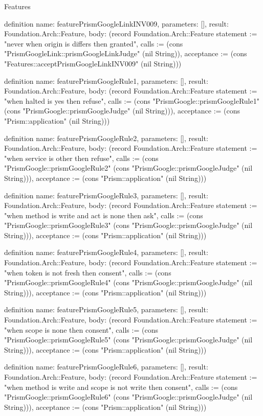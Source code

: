 \begin{lexlean}{Features}
\begin{semanticmodule}
definition{
  name: featurePrismGoogleLinkINV009,
  parameters: [],
  result: Foundation.Arch::Feature,
  body: (record Foundation.Arch::Feature {statement := "never when origin is differs then granted", calls := (cons "PrismGoogleLink::prismGoogleLinkJudge" (nil String)), acceptance := (cons "Features::acceptPrismGoogleLinkINV009" (nil String))})
}

definition{
  name: featurePrismGoogleRule1,
  parameters: [],
  result: Foundation.Arch::Feature,
  body: (record Foundation.Arch::Feature {statement := "when halted is yes then refuse", calls := (cons "PrismGoogle::prismGoogleRule1" (cons "PrismGoogle::prismGoogleJudge" (nil String))), acceptance := (cons "Prism::application" (nil String))})
}

definition{
  name: featurePrismGoogleRule2,
  parameters: [],
  result: Foundation.Arch::Feature,
  body: (record Foundation.Arch::Feature {statement := "when service is other then refuse", calls := (cons "PrismGoogle::prismGoogleRule2" (cons "PrismGoogle::prismGoogleJudge" (nil String))), acceptance := (cons "Prism::application" (nil String))})
}

definition{
  name: featurePrismGoogleRule3,
  parameters: [],
  result: Foundation.Arch::Feature,
  body: (record Foundation.Arch::Feature {statement := "when method is write and act is none then ask", calls := (cons "PrismGoogle::prismGoogleRule3" (cons "PrismGoogle::prismGoogleJudge" (nil String))), acceptance := (cons "Prism::application" (nil String))})
}

definition{
  name: featurePrismGoogleRule4,
  parameters: [],
  result: Foundation.Arch::Feature,
  body: (record Foundation.Arch::Feature {statement := "when token is not fresh then consent", calls := (cons "PrismGoogle::prismGoogleRule4" (cons "PrismGoogle::prismGoogleJudge" (nil String))), acceptance := (cons "Prism::application" (nil String))})
}

definition{
  name: featurePrismGoogleRule5,
  parameters: [],
  result: Foundation.Arch::Feature,
  body: (record Foundation.Arch::Feature {statement := "when scope is none then consent", calls := (cons "PrismGoogle::prismGoogleRule5" (cons "PrismGoogle::prismGoogleJudge" (nil String))), acceptance := (cons "Prism::application" (nil String))})
}

definition{
  name: featurePrismGoogleRule6,
  parameters: [],
  result: Foundation.Arch::Feature,
  body: (record Foundation.Arch::Feature {statement := "when method is write and scope is not write then consent", calls := (cons "PrismGoogle::prismGoogleRule6" (cons "PrismGoogle::prismGoogleJudge" (nil String))), acceptance := (cons "Prism::application" (nil String))})
}


\end{semanticmodule}
\end{lexlean}
